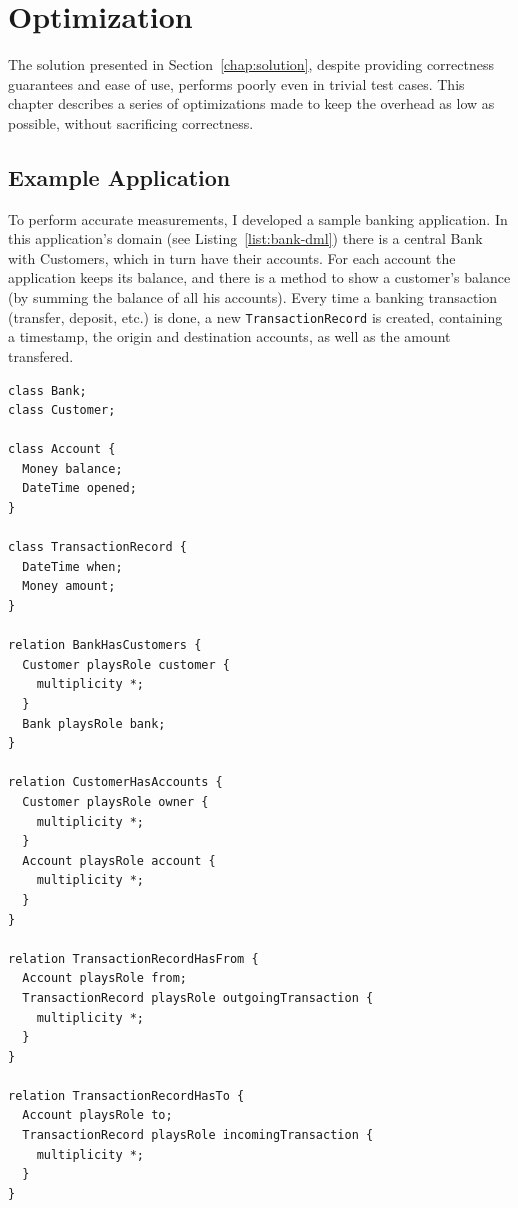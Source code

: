 \documentclass{llncs}
\begin{document}

\section{Optimization}

The solution presented in Section~\ref{chap:solution}, despite
providing correctness guarantees and ease of use, performs poorly even
in trivial test cases. This chapter describes a series of
optimizations made to keep the overhead as low as possible, without
sacrificing correctness.

\subsection{Example Application}

To perform accurate measurements, I developed a sample banking
application. In this application's domain (see
Listing~\ref{list:bank-dml}) there is a central Bank with Customers,
which in turn have their accounts. For each account the application
keeps its balance, and there is a method to show a customer's balance
(by summing the balance of all his accounts). Every time a banking
transaction (transfer, deposit, etc.) is done, a new
\texttt{TransactionRecord} is created, containing a timestamp, the
origin and destination accounts, as well as the amount transfered.

\begin{lstlisting}[caption={Domain Model for the Banking Application},
  label={list:bank-dml},float]
class Bank;
class Customer;

class Account {
  Money balance;
  DateTime opened;
}

class TransactionRecord {
  DateTime when;
  Money amount;
}

relation BankHasCustomers {
  Customer playsRole customer {
    multiplicity *;
  }
  Bank playsRole bank;
}

relation CustomerHasAccounts {
  Customer playsRole owner {
    multiplicity *;
  }
  Account playsRole account {
    multiplicity *;
  }
}

relation TransactionRecordHasFrom {
  Account playsRole from;
  TransactionRecord playsRole outgoingTransaction {
    multiplicity *;
  }
}

relation TransactionRecordHasTo {
  Account playsRole to;
  TransactionRecord playsRole incomingTransaction {
    multiplicity *;
  }
}
\end{lstlisting}
\end{document}
